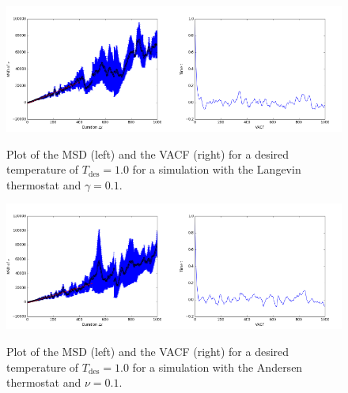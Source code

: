 \begin{figure}[ht]
	\centering
	\includegraphics[width=0.5\textwidth]{../dat/langevin_T1d0_gamma0d1_MSD.png}\includegraphics[width=0.5\textwidth]{../dat/langevin_T1d0_gamma0d1_VACF.png}
	\caption{
		Plot of the MSD (left) and the VACF (right) for a desired temperature of $T_\text{des}=1.0$ for a simulation with the Langevin thermostat and $\gamma =0.1$.
	}
	\label{langevin1}
\end{figure}

\begin{figure}[ht]
	\centering
	\includegraphics[width=0.5\textwidth]{../dat/andersen_T1d0_nu0d1_MSD.png}\includegraphics[width=0.5\textwidth]{../dat/andersen_T1d0_nu0d1_VACF.png}
	\caption{
		Plot of the MSD (left) and the VACF (right) for a desired temperature of $T_\text{des}=1.0$ for a simulation with the Andersen thermostat and $\nu =0.1$.
	}
	\label{andersennana0}
\end{figure}

